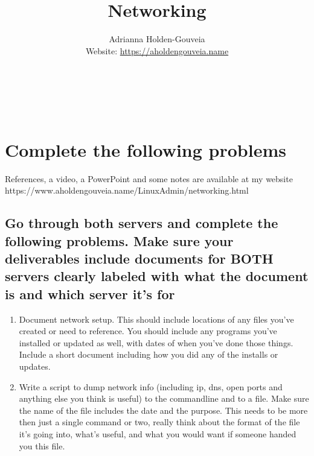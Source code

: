 \documentclass[12pt]{article}
\title{Networking}
\author{
        Adrianna Holden-Gouveia \\
        Website: \url{https://aholdengouveia.name}\\ 
        \date{\vspace{-5ex}}
        \faLinkedin{: aholdengouveia} \\
        \faGithub {: aholdengouveia} \\
        \faTwitter {: aholdengouveia} \\
        }
\begin{document}
    

\maketitle


\section*{Complete the following problems}

References, a video, a PowerPoint and some notes are available at my website
https://www.aholdengouveia.name/LinuxAdmin/networking.html



\subsection*{Go through both servers and complete the following problems.  Make sure your deliverables include documents for BOTH servers clearly labeled with what the document is and which server it's for}
    \begin{enumerate}
        \item Document network setup. This should include locations of any files you've created or need to reference. You should include any programs you've installed or updated as well, with dates of when you've done those things. Include a short document including how you did any of the installs or updates. 
        \item Write a script to dump network info (including ip, dns, open ports and anything else you think is useful) to the commandline and to a file.  Make sure the name of the file includes the date and the purpose.  This needs to be more then just a single command or two, really think about the format of the file it's going into, what's useful, and what you would want if someone handed you this file.
    \end{enumerate}
\end{document}

